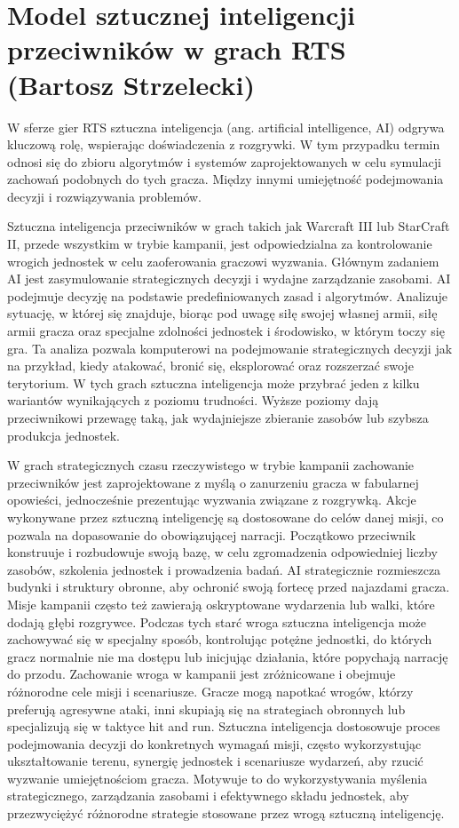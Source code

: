 \section{Model sztucznej inteligencji przeciwników w grach RTS (Bartosz Strzelecki)}
W sferze gier RTS sztuczna inteligencja (ang. artificial intelligence, AI) odgrywa kluczową rolę, wspierając doświadczenia z rozgrywki.
W tym przypadku termin odnosi się do zbioru algorytmów i systemów zaprojektowanych w celu symulacji
zachowań podobnych do tych gracza. Między innymi umiejętność podejmowania decyzji i rozwiązywania problemów.

Sztuczna inteligencja przeciwników w grach takich jak Warcraft III lub StarCraft II, przede wszystkim w trybie kampanii,
jest odpowiedzialna za kontrolowanie wrogich jednostek w celu zaoferowania graczowi wyzwania. Głównym zadaniem AI jest zasymulowanie
strategicznych decyzji i wydajne zarządzanie zasobami.
AI podejmuje decyzję na podstawie predefiniowanych zasad i algorytmów. Analizuje sytuację, w której się znajduje, biorąc pod uwagę
siłę swojej własnej armii, siłę armii gracza oraz specjalne zdolności jednostek i środowisko, w którym toczy się gra.
Ta analiza pozwala komputerowi na podejmowanie strategicznych decyzji jak na przykład, kiedy atakować, bronić się, eksplorować oraz rozszerzać swoje terytorium.
W tych grach sztuczna inteligencja może przybrać jeden z kilku wariantów wynikających z poziomu trudności. Wyższe poziomy
dają przeciwnikowi przewagę taką, jak wydajniejsze zbieranie zasobów lub szybsza produkcja jednostek.

W grach strategicznych czasu rzeczywistego w trybie kampanii zachowanie przeciwników jest zaprojektowane z myślą o zanurzeniu gracza w fabularnej opowieści, jednocześnie
prezentując wyzwania związane z rozgrywką. Akcje wykonywane przez sztuczną inteligencję są dostosowane do celów danej misji, co pozwala
na dopasowanie do obowiązującej narracji.
Początkowo przeciwnik konstruuje i rozbudowuje swoją bazę, w celu zgromadzenia odpowiedniej liczby zasobów, szkolenia jednostek i prowadzenia badań.
AI strategicznie rozmieszcza budynki i struktury obronne, aby ochronić swoją fortecę przed najazdami gracza. 
Misje kampanii często też zawierają oskryptowane wydarzenia lub walki, które dodają głębi rozgrywce. Podczas tych starć wroga sztuczna inteligencja
może zachowywać się w specjalny sposób, kontrolując potężne jednostki, do których gracz normalnie nie ma dostępu lub inicjując działania, które popychają
narrację do przodu.
Zachowanie wroga w kampanii jest zróżnicowane i obejmuje różnorodne cele misji i scenariusze. Gracze mogą napotkać wrogów, którzy preferują agresywne ataki,
inni skupiają się na strategiach obronnych lub specjalizują się w taktyce hit and run. Sztuczna inteligencja dostosowuje proces podejmowania decyzji do
konkretnych wymagań misji, często wykorzystując ukształtowanie terenu, synergię jednostek i scenariusze wydarzeń, aby rzucić wyzwanie umiejętnościom gracza.
Motywuje to do wykorzystywania myślenia strategicznego, zarządzania zasobami i efektywnego składu jednostek, aby przezwyciężyć różnorodne strategie stosowane przez wrogą sztuczną inteligencję.
